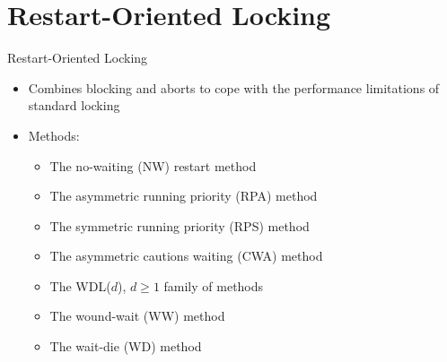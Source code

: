 \documentclass[sans]{beamer}
\begin{document}


\section{Restart-Oriented Locking}

\begin{frame}{Restart-Oriented Locking}
  \begin{itemize}
    \item Combines blocking and aborts to cope with the performance
          limitations of standard locking
    \item Methods:
      \begin{itemize}
        \item The no-waiting (NW) restart method
        \item The asymmetric running priority (RPA) method
        \item The symmetric running priority (RPS) method
        \item The asymmetric cautions waiting (CWA) method
        \item The WDL($d$), $d \geq 1$ family of methods
        \item The wound-wait (WW) method
        \item The wait-die (WD) method
      \end{itemize}
  \end{itemize}
\end{frame}
\end{document}

